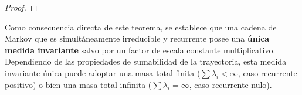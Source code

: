 \begin{teo}
\begin{proof}


\end{proof}
\end{teo}


\begin{observacion}
    Como consecuencia directa de este teorema, se establece que una cadena de Markov que es simultáneamente irreducible y recurrente posee una \textbf{única medida invariante} salvo por un factor de escala constante multiplicativo. Dependiendo de las propiedades de sumabilidad de la trayectoria, esta medida invariante única puede adoptar una masa total finita ($\sum \lambda_i < \infty$, caso recurrente positivo) o bien una masa total infinita ($\sum \lambda_i = \infty$, caso recurrente nulo).
\end{observacion}


